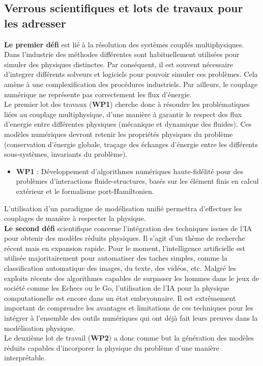 \documentclass[12pt, french]{article}
\begin{document}
\subsection{Verrous scientifiques et lots de travaux pour les adresser}
\textbf{Le premier défi} est lié \`a la résolution des systèmes couplés multiphysiques.  Dans l'industrie des méthodes différentes sont habituellement utilisées pour simuler des physiques distinctes. Par conséquent, il est souvent nécessaire d'integrer différents solveurs et logiciels pour pouvoir simuler ces problèmes. Cela amène \`a une complexification des procédures industriels. Par ailleurs, le couplage numérique ne représente pas correctement les flux d’énergie. \\
Le premier lot des travaux (\textbf{WP1}) cherche donc à résoudre les problématiques liées au couplage multiphysique, d'une manière \`a garantir le respect des flux d'energie entre différentes physiques (mécanique et dynamique des fluides). Ces modèles numériques devront retenir les propriétés physiques du problème (conservation d’énergie globale, traçage des échanges d’énergie entre les différents sous-systèmes, invariants du problème). \\

\begin{itemize}
	\item \textbf{WP1} : Développement d'algorithmes numériques haute-fidélité pour des problèmes d'interactions fluide-structures, basés sur les élément finis en calcul extérieur et le formalisme port-Hamiltonien. \\
\end{itemize}

L’utilisation d’un paradigme de modélisation unifié permettra d’effectuer les couplages de manière à respecter la physique.\\

\textbf{Le second défi} scientifique concerne l'intégration des techniques issues de l'IA pour obtenir des modèles réduits physiques. Il s'agit d'un thème de recherche récent mais en expansion rapide. Pour le moment, l'intelligence artificielle est utilisée majoritairement pour automatiser des taches simples, comme la classification automatique des images, du texte, des vidéos, etc. Malgré les exploits récents des algorithmes capables de surpasser les hommes dans le jeux de société comme les Echecs ou le Go, l'utilisation de l'IA pour la physique computationelle est encore dans un état embryonnaire. Il est extrêmement important de comprendre les avantages et limitations de ces techniques pour les intégrer à l'ensemble des outils numériques qui ont déjà fait leurs preuves dans la modélisation physique. \\
Le deuxième lot de travail (\textbf{WP2}) a donc comme but la génération des modèles réduits capables d'incorporer la physique du problème d'une manière interprétable. \\
\end{document}
